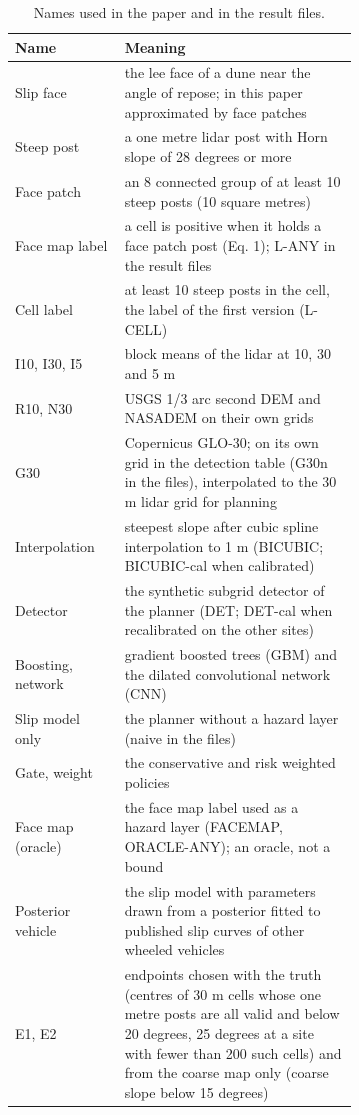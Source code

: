 \documentclass[10pt]{article}
\begin{document}
\begin{table}[H]
\caption{Names used in the paper and in the result files.}
\label{tab:glossary}
\centering\small
\begin{tabular}{@{}lp{0.68\linewidth}@{}}
\toprule
Name & Meaning \\
\midrule
Slip face & the lee face of a dune near the angle of repose; in this paper approximated by face patches \\
Steep post & a one metre lidar post with Horn slope of 28 degrees or more \\
Face patch & an 8 connected group of at least 10 steep posts (10 square metres) \\
Face map label & a cell is positive when it holds a face patch post (Eq. 1); L-ANY in the result files \\
Cell label & at least 10 steep posts in the cell, the label of the first version (L-CELL) \\
I10, I30, I5 & block means of the lidar at 10, 30 and 5 m \\
R10, N30 & USGS 1/3 arc second DEM and NASADEM on their own grids \\
G30 & Copernicus GLO-30; on its own grid in the detection table (G30n in the files), interpolated to the 30 m lidar grid for planning \\
Interpolation & steepest slope after cubic spline interpolation to 1 m (BICUBIC; BICUBIC-cal when calibrated) \\
Detector & the synthetic subgrid detector of the planner (DET; DET-cal when recalibrated on the other sites) \\
Boosting, network & gradient boosted trees (GBM) and the dilated convolutional network (CNN) \\
Slip model only & the planner without a hazard layer (naive in the files) \\
Gate, weight & the conservative and risk weighted policies \\
Face map (oracle) & the face map label used as a hazard layer (FACEMAP, ORACLE-ANY); an oracle, not a bound \\
Posterior vehicle & the slip model with parameters drawn from a posterior fitted to published slip curves of other wheeled vehicles \\
E1, E2 & endpoints chosen with the truth (centres of 30 m cells whose one metre posts are all valid and below 20 degrees, 25 degrees at a site with fewer than 200 such cells) and from the coarse map only (coarse slope below 15 degrees) \\

\end{tabular}
\end{table}
\end{document}
